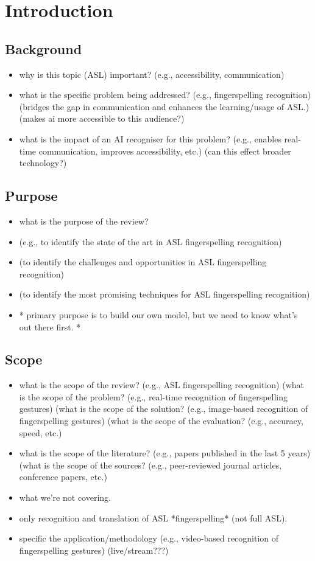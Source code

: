 \section{Introduction}
\subsection{Background}
\begin{itemize}
    \item why is this topic (ASL) important? (e.g., accessibility, communication)
    \item what is the specific problem being addressed? (e.g., fingerspelling recognition) (bridges the gap in communication and enhances the learning/usage of ASL.) (makes ai more accessible to this audience?)
    \item what is the impact of an AI recogniser for this problem? (e.g., enables real-time communication, improves accessibility, etc.) (can this effect broader technology?)
\end{itemize}

\subsection{Purpose}

\begin{itemize}
    \item what is the purpose of the review?
    \item (e.g., to identify the state of the art in ASL fingerspelling recognition)
    \item (to identify the challenges and opportunities in ASL fingerspelling recognition)
    \item (to identify the most promising techniques for ASL fingerspelling recognition)
    \item * primary purpose is to build our own model, but we need to know what's out there first. *

\end{itemize}
\subsection{Scope}
\begin{itemize}
    \item what is the scope of the review? (e.g., ASL fingerspelling recognition) (what is the scope of the problem? (e.g., real-time recognition of fingerspelling gestures) (what is the scope of the solution? (e.g., image-based recognition of fingerspelling gestures) (what is the scope of the evaluation? (e.g., accuracy, speed, etc.)
    \item what is the scope of the literature? (e.g., papers published in the last 5 years) (what is the scope of the sources? (e.g., peer-reviewed journal articles, conference papers, etc.)
    \item what we're not covering.
    \item only recognition and translation of ASL *fingerspelling* (not full ASL).
    \item specific the application/methodology (e.g., video-based recognition of fingerspelling gestures) (live/stream???)
\end{itemize}

